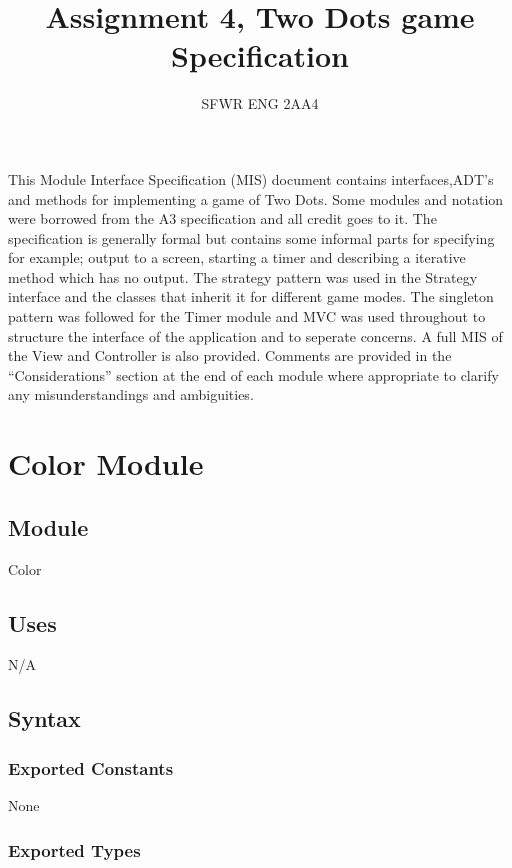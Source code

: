\documentclass[12pt]{article}
\title{Assignment 4, Two Dots game Specification}
\author{SFWR ENG 2AA4}
\begin{document}
\maketitle
This Module Interface Specification (MIS) document contains interfaces,ADT's and
methods for implementing a game of Two Dots. Some modules and notation were borrowed from the A3 specification and all credit goes to it. The specification is generally formal but contains some informal parts for specifying for example; output to a screen, starting a timer and describing a iterative method which has no output. The strategy pattern was used in the Strategy interface and the classes that inherit it for different game modes. The singleton pattern was followed for the Timer module and MVC was used throughout to structure the interface of the application and to seperate concerns. A full MIS of the View and Controller is also provided. Comments are provided in the ``Considerations'' section at the end of each module where appropriate to clarify any misunderstandings and ambiguities.

\newpage

\section* {Color Module}

\subsection*{Module}

Color

\subsection* {Uses}

N/A

\subsection* {Syntax}

\subsubsection* {Exported Constants}

None

\subsubsection* {Exported Types}
\end{document}
